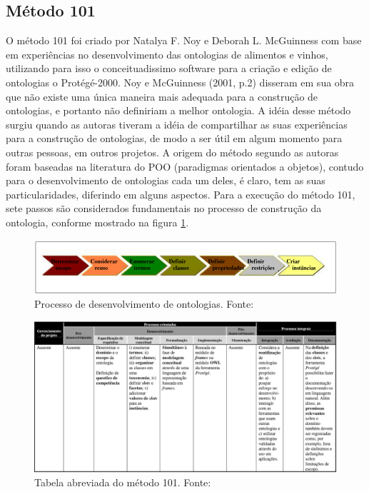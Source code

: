 \subsection{Método 101} 
 O método 101 foi criado por  Natalya F. Noy e Deborah L. McGuinness com base em experiências no desenvolvimento
 das ontologias de alimentos e vinhos, utilizando para isso o conceituadissimo software para a criação e edição de
 ontologias o Protégé-2000. Noy e McGuinness (2001, p.2) disseram em sua obra que não existe uma única maneira mais
 adequada para a construção de ontologias, e portanto não definiriam a melhor ontologia. A idéia desse método surgiu
 quando as autoras tiveram a idéia de compartilhar  as suas experiências para a construção de ontologias, de modo a
 ser útil em algum momento para outras pessoas, em outros projetos. A origem do método segundo as autoras foram baseadas
 na literatura do POO (paradigmas orientados a objetos), contudo para o desenvolvimento de ontologias cada um deles, é
 claro, tem as suas particularidades, diferindo em alguns aspectos. \cite{VariosAutores2009} Para a execução do método 101,
 sete passos são considerados fundamentais no processo de construção da ontologia, conforme mostrado na figura \ref{fig:processo_101}.

\begin{figure}[h] 
\centering 
\includegraphics[scale=0.6]{Figuras/11.png} 
\caption[Processo de desenvolvimento de ontologias.]{Processo de desenvolvimento de ontologias. Fonte: \cite{DanielaLucas2008}}
\label{fig:processo_101}
\end{figure}

\begin{figure}[h] 
\centering 
\includegraphics[scale=0.4]{Figuras/12.png} 
\caption[Tabela abreviada do método 101]{Tabela abreviada do método 101. Fonte: \cite{DanielaLucas2008}}
\end{figure}

